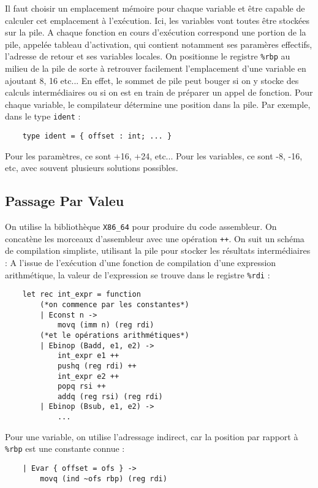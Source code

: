 \documentclass{cours}
\begin{document}
Il faut choisir un emplacement mémoire pour chaque variable et être capable de calculer cet emplacement à l'exécution. Ici, les variables vont toutes être stockées sur la pile. A chaque fonction en cours d'exécution correspond une portion de la pile, appelée tableau d'activation, qui contient notamment ses paramères effectifs, l'adresse de retour et ses variables locales. On positionne le registre \texttt{\%rbp} au milieu de la pile de sorte à retrouver facilement l'emplacement d'une variable en ajoutant 8, 16 etc... En effet, le sommet de pile peut bouger si on y stocke des calculs intermédiaires ou si on est en train de préparer un appel de fonction. Pour chaque variable, le compilateur détermine une position dans la pile. Par exemple, dans le type \texttt{ident} :
\begin{verbatim}
    type ident = { offset : int; ... }
\end{verbatim}
Pour les paramètres, ce sont +16, +24, etc... Pour les variables, ce sont -8, -16, etc, avec souvent plusieurs solutions possibles.

\subsection{Passage Par Valeu}
On utilise la bibliothèque \texttt{X86\_64} pour produire du code assembleur. On concatène les morceaux d'assembleur avec une opération \texttt{++}. On suit un schéma de compilation simpliste, utilisant la pile pour stocker les résultats intermédiaires : A l'issue de l'exécution d'une fonction de compilation d'une expression arithmétique, la valeur de l'expression se trouve dans le registre \texttt{\%rdi} :
\begin{verbatim}
    let rec int_expr = function
        (*on commence par les constantes*)
        | Econst n ->
            movq (imm n) (reg rdi)
        (*et le opérations arithmétiques*)
        | Ebinop (Badd, e1, e2) ->
            int_expr e1 ++
            pushq (reg rdi) ++
            int_expr e2 ++
            popq rsi ++
            addq (reg rsi) (reg rdi)
        | Ebinop (Bsub, e1, e2) ->
            ...
\end{verbatim}

Pour une variable, on utilise l'adressage indirect, car la position par rapport à \texttt{\%rbp} est une constante connue :
\begin{verbatim}
    | Evar { offset = ofs } ->
        movq (ind ~ofs rbp) (reg rdi)
\end{verbatim}
\end{document}
